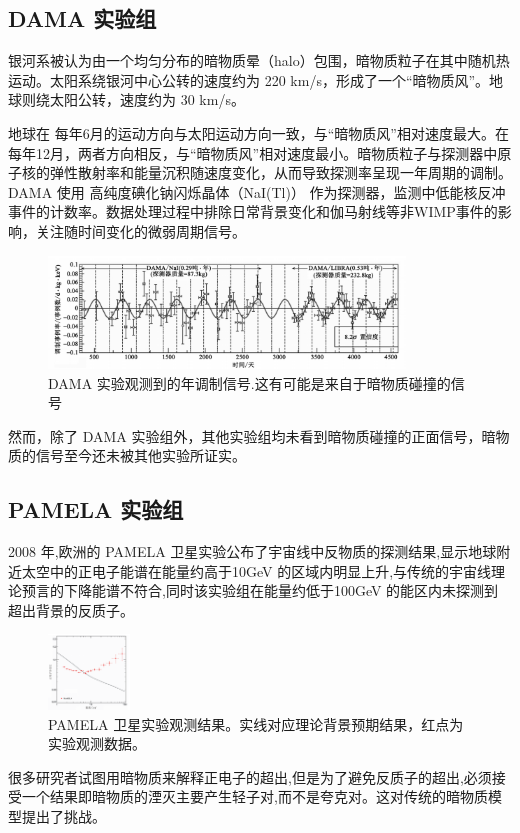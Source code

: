 \documentclass{beamer} %
\begin{document}
\subsection{DAMA 实验组}

\begin{frame}
银河系被认为由一个均匀分布的暗物质晕（halo）包围，暗物质粒子在其中随机热运动。太阳系绕银河中心公转的速度约为 220 km/s，形成了一个“暗物质风”。地球则绕太阳公转，速度约为 30 km/s。

地球在 每年6月的运动方向与太阳运动方向一致，与“暗物质风”相对速度最大。在 每年12月，两者方向相反，与“暗物质风”相对速度最小。暗物质粒子与探测器中原子核的弹性散射率和能量沉积随速度变化，从而导致探测率呈现一年周期的调制。DAMA 使用 高纯度碘化钠闪烁晶体（NaI(Tl)） 作为探测器，监测中低能核反冲事件的计数率。数据处理过程中排除日常背景变化和伽马射线等非WIMP事件的影响，关注随时间变化的微弱周期信号。
\end{frame}

\begin{frame}
\begin{figure}[!htbp]
    \centering    
    \includegraphics[height=3cm]{Img/4-1.png}
    \caption{DAMA 实验观测到的年调制信号.这有可能是来自于暗物质碰撞的信号 }
    \label{4-1}
\end{figure}

然而，除了 DAMA 实验组外，其他实验组均未看到暗物质碰撞的正面信号，暗物质的信号至今还未被其他实验所证实。
\end{frame}

\subsection{PAMELA 实验组}

\begin{frame}
2008 年,欧洲的 PAMELA 卫星实验公布了宇宙线中反物质的探测结果,显示地球附近太空中的正电子能谱在能量约高于10GeV 的区域内明显上升,与传统的宇宙线理论预言的下降能谱不符合,同时该实验组在能量约低于100GeV 的能区内未探测到超出背景的反质子。

\begin{figure}[!htbp]
    \centering    
    \includegraphics[height=2cm]{Img/4-2.png}
    \caption{PAMELA 卫星实验观测结果。实线对应理论背景预期结果，红点为实验观测数据。 }
    \label{4-2}
\end{figure}

很多研究者试图用暗物质来解释正电子的超出,但是为了避免反质子的超出,必须接受一个结果即暗物质的湮灭主要产生轻子对,而不是夸克对。这对传统的暗物质模型提出了挑战。
\end{frame}
\end{document}
